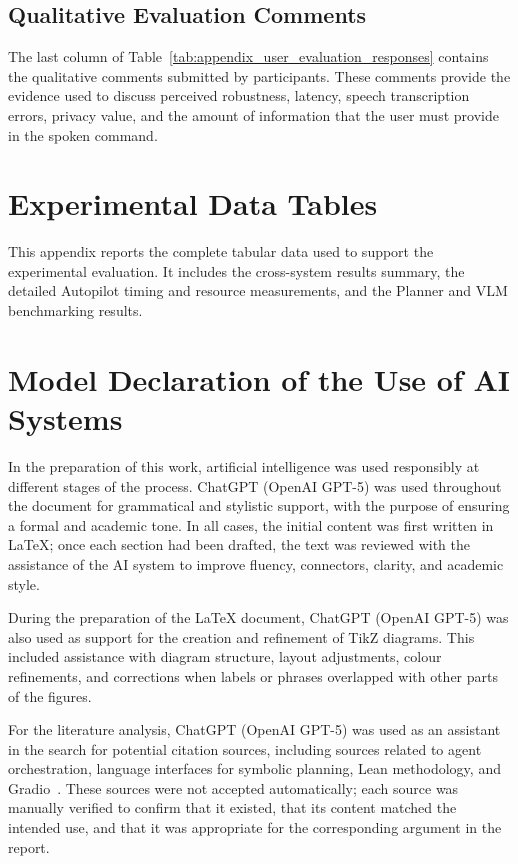 \section{Qualitative Evaluation Comments}

The last column of Table~\ref{tab:appendix_user_evaluation_responses} contains the qualitative comments submitted by participants. These comments provide the evidence used to discuss perceived robustness, latency, speech transcription errors, privacy value, and the amount of information that the user must provide in the spoken command.

\chapter{Experimental Data Tables}
\label{app:experimental_data}

This appendix reports the complete tabular data used to support the experimental evaluation. It includes the cross-system results summary, the detailed Autopilot timing and resource measurements, and the Planner and VLM benchmarking results.



\chapter{Model Declaration of the Use of AI Systems}
\label{app:ai_use_declaration}

In the preparation of this work, artificial intelligence was used responsibly at different stages of the process. ChatGPT (OpenAI GPT-5) was used throughout the document for grammatical and stylistic support, with the purpose of ensuring a formal and academic tone. In all cases, the initial content was first written in LaTeX; once each section had been drafted, the text was reviewed with the assistance of the AI system to improve fluency, connectors, clarity, and academic style.

During the preparation of the LaTeX document, ChatGPT (OpenAI GPT-5) was also used as support for the creation and refinement of TikZ diagrams. This included assistance with diagram structure, layout adjustments, colour refinements, and corrections when labels or phrases overlapped with other parts of the figures.

For the literature analysis, ChatGPT (OpenAI GPT-5) was used as an assistant in the search for potential citation sources, including sources related to agent orchestration, language interfaces for symbolic planning, Lean methodology, and Gradio~\cite{LangGraph2024,Liu2023LLMP,Ries2011,Abid2019Gradio}. These sources were not accepted automatically; each source was manually verified to confirm that it existed, that its content matched the intended use, and that it was appropriate for the corresponding argument in the report.

